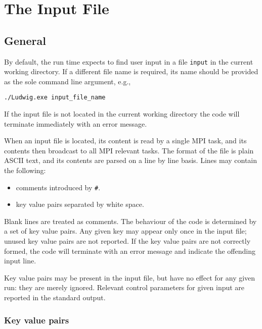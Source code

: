 %
%
%
%
%

\section{The Input File}

\subsection{General}

By default, the run time expects to find user input in a file
\texttt{input} in the current working directory. If a different
file name is required, its name
should be provided as the sole command line argument, e.g.,
\begin{lstlisting}
./Ludwig.exe input_file_name
\end{lstlisting}
If the input file is not located in the current working directory
the code will terminate immediately with an error message.

When an input file is located, its content is read by a single MPI
task, and its contents then broadcast to all MPI relevant tasks.
The format of the file is plain ASCII text, and its contents are
parsed on a line by line basis. Lines may contain the following:
\begin{itemize}
\item comments introduced by \texttt{\#}.
\item key value pairs separated by white space.
\end{itemize}
Blank lines are treated as comments. The behaviour of the code is
determined by a set of key value pairs. Any given key may appear
only once in the input file; unused key value pairs are not reported.
If the key value pairs are not correctly formed, the code will terminate
with an error message and indicate the offending input line.

Key value pairs may be present in the input file, but have no effect for
any given run: they are merely ignored. Relevant control parameters for
given input are reported in the standard output.

\subsubsection{Key value pairs}

